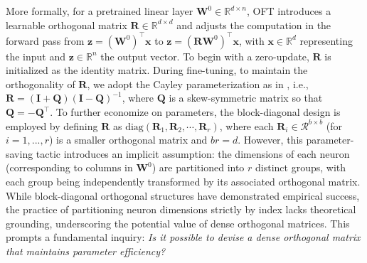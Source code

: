More formally, for a pretrained linear layer $\bm{W}^0\in\mathbb{R}^{d\times n}$, OFT introduces a learnable orthogonal matrix $\bm{R}\in\mathbb{R}^{d\times d}$ and adjusts the computation in the forward pass from $\bm{z} = (\bm{W}^0)^\top \bm{x}$ to $\bm{z} = (\bm{R} \bm{W}^0)^\top \bm{x}$, with $\bm{x}\in\mathbb{R}^d$ representing the input and $\bm{z}\in\mathbb{R}^n$ the output vector. To begin with a zero-update, $\bm{R}$ is initialized as the identity matrix. During fine-tuning, to maintain the orthogonality of $\bm{R}$, we adopt the Cayley parameterization as in \cite{qiu2023controlling,liu2021orthogonal}, i.e., $\bm{R}=(\bm{I}+\bm{Q})(\bm{I}-\bm{Q})^{-1}$, where $\bm{Q}$ is a skew-symmetric matrix so that $\bm{Q}=-\bm{Q}^\top$. To further economize on parameters, the block-diagonal design is employed by defining $\bm{R}$ as $\text{diag}(\bm{R}_1,\bm{R}_2,\cdots,\bm{R}_r)$, where each $\bm{R}_i\in\mathcal{R}^{b\times b}$ (for $i=1,...,r$) is a smaller orthogonal matrix and $br=d$. However, this parameter-saving tactic introduces an implicit assumption: the dimensions of each neuron (corresponding to columns in $\bm{W}^0$) are partitioned into $r$ distinct groups, with each group being independently transformed by its associated orthogonal matrix. While block-diagonal orthogonal structures have demonstrated empirical success, the practice of partitioning neuron dimensions strictly by index lacks theoretical grounding, underscoring the potential value of dense orthogonal matrices. This prompts a fundamental inquiry: \emph{Is it possible to devise a dense orthogonal matrix that maintains parameter efficiency?}

